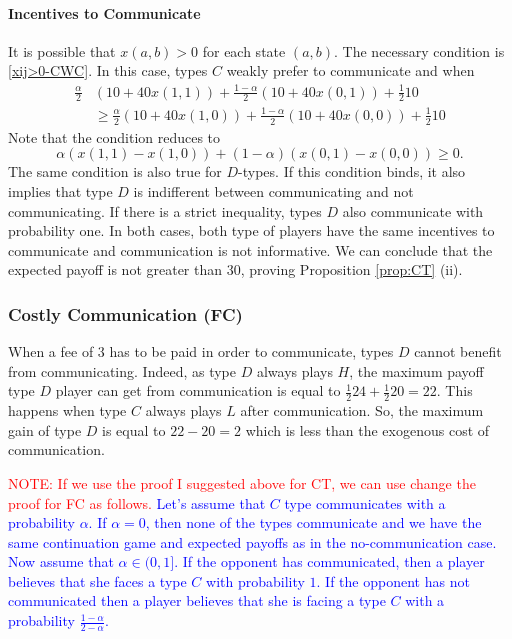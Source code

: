 \documentclass[12pt]{article}
\theoremstyle{break}
\begin{document}
\paragraph{Incentives to Communicate}
It is possible that $x(a,b)>0$ for each state $(a,b)$. The necessary condition is \eqref{xij>0-CWC}. In this case, types $C$ weakly prefer to communicate and when
\begin{equation}\label{IC-comm-CWC}
	\begin{split}
	\frac{\alpha}{2}& (10+40x(1,1))+\frac{1-\alpha}{2}(10+40x(0,1))+\frac{1}{2}10\\ 
	&\geq \frac{\alpha}{2} (10+40x(1,0))+\frac{1-\alpha}{2}(10+40x(0,0))+\frac{1}{2}10
	\end{split}
\end{equation}
Note that the condition reduces to
\begin{equation}\label{CWC-NC-a,b>0}
	\alpha (x(1,1)-x(1,0))+(1-\alpha)(x(0,1)-x(0,0))\geq 0.
\end{equation}
%
The same condition is also true for $D$-types. If this condition binds, it also implies that type $D$ is indifferent between communicating and not communicating. If there is a strict inequality, types $D$ also communicate with probability one. In both cases, both type of players have the same incentives to communicate and communication is not informative. We can conclude that the expected payoff is not greater than $30$, proving Proposition \ref{prop:CT} (ii).



\subsubsection*{Costly Communication (FC)}
When a fee of $3$ has to be paid in order to communicate, types $D$ cannot benefit from communicating. Indeed, as type $D$ always plays $H$, the maximum payoff type $D$ player can get from communication is equal to $\frac{1}{2}24 +\frac{1}{2}20=22$. This happens when type $C$ always plays $L$ after communication. So, the maximum gain of type $D$ is equal to $22-20=2$ which is less than the exogenous cost of communication.

\textcolor{red}{NOTE: If we use the proof I suggested above for CT, we can use change the proof for FC as follows.} \textcolor{blue}{Let's assume that $C$ type communicates with a probability $\alpha$. If $\alpha=0$, then none of the types communicate and we have the same continuation game and expected payoffs as in the no-communication case. Now assume that $\alpha\in (0,1]$. If the opponent has communicated, then a player believes that she faces a type $C$ with probability $1$. If the opponent has not communicated then a player believes that she is facing a type $C$ with a probability $\frac{1-\alpha}{2-\alpha}$.}
\end{document}
